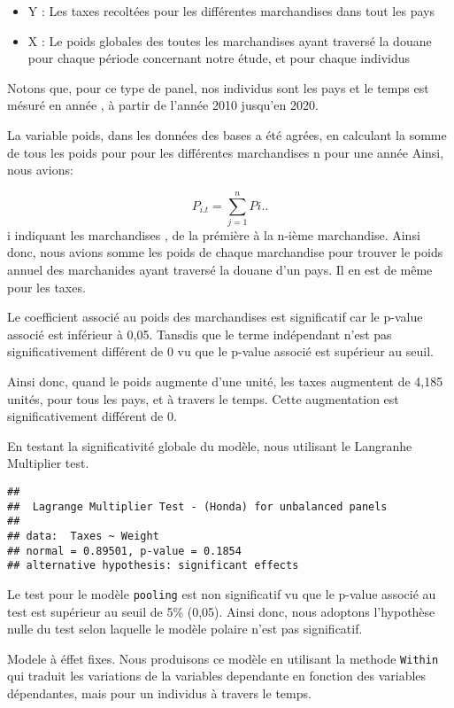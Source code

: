\documentclass[
]{book}
\providecommand{\tightlist}{%
  \setlength{\itemsep}{0pt}\setlength{\parskip}{0pt}}
\begin{document}
\begin{itemize}
\tightlist
\item
  Y : Les taxes recoltées pour les différentes marchandises dans tout les pays
\item
  X : Le poids globales des toutes les marchandises ayant traversé la douane pour chaque période concernant notre étude, et pour chaque individus
\end{itemize}

Notons que, pour ce type de panel, nos individus sont les pays et le temps est mésuré en année , à partir de l'année 2010 jusqu'en 2020.

La variable poids, dans les données des bases a été agrées, en calculant la somme de tous les poids pour pour les différentes marchandises n pour une année
Ainsi, nous avions:

\[ P_{i.t}=\sum_{j=1}^{n} P{i..} \]
i indiquant les marchandises , de la prémière à la n-ième marchandise. Ainsi donc, nous avions somme les poids de chaque marchandise pour trouver le poids annuel des marchanides ayant traversé la douane d'un pays. Il en est de même pour les taxes.

Le coefficient associé au poids des marchandises est significatif car le p-value associé est inférieur à 0,05. Tansdis que le terme indépendant n'est pas significativement différent de 0 vu que le p-value associé est supérieur au seuil.

Ainsi donc, quand le poids augmente d'une unité, les taxes augmentent de 4,185 unités, pour tous les pays, et à travers le temps. Cette augmentation est significativement différent de 0.

En testant la significativité globale du modèle, nous utilisant le Langranhe Multiplier test.

\begin{verbatim}
## 
##  Lagrange Multiplier Test - (Honda) for unbalanced panels
## 
## data:  Taxes ~ Weight
## normal = 0.89501, p-value = 0.1854
## alternative hypothesis: significant effects
\end{verbatim}

Le test pour le modèle \texttt{pooling} est non significatif vu que le p-value associé au test est supérieur au seuil de 5\% (0,05). Ainsi donc, nous adoptons l'hypothèse nulle du test selon laquelle le modèle polaire n'est pas significatif.

Modele à éffet fixes.
Nous produisons ce modèle en utilisant la methode \texttt{Within} qui traduit les variations de la variables dependante en fonction des variables dépendantes, mais pour un individus à travers le temps.
\end{document}
